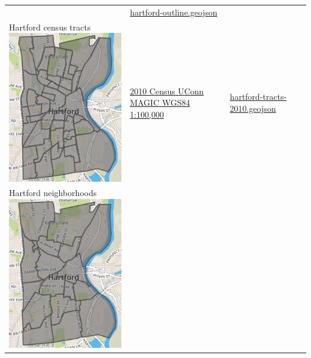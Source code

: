 \documentclass[
  english,
]{book}
\begin{document}
\begin{longtable}[]{@{}llll@{}}
\begin{minipage}[t]{0.22\columnwidth}
\end{minipage} & \begin{minipage}[t]{0.19\columnwidth}\raggedright
\href{data/hartford-outline.geojson}{hartford-outline.geojson}\strut
\end{minipage} & \begin{minipage}[t]{0.19\columnwidth}\raggedright
\strut
\end{minipage}\tabularnewline
\begin{minipage}[t]{0.28\columnwidth}\raggedright
Hartford census tracts \includegraphics{data/hartford-tracts-2010.png}\strut
\end{minipage} & \begin{minipage}[t]{0.22\columnwidth}\raggedright
\href{http://magic.lib.uconn.edu/connecticut_data.html\#boundaries}{2010 Census UConn MAGIC WGS84 1:100,000}\strut
\end{minipage} & \begin{minipage}[t]{0.19\columnwidth}\raggedright
\href{data/hartford-tracts-2010.geojson}{hartford-tracts-2010.geojson}\strut
\end{minipage} & \begin{minipage}[t]{0.19\columnwidth}\raggedright
\strut
\end{minipage}\tabularnewline
\begin{minipage}[t]{0.28\columnwidth}\raggedright
Hartford neighborhoods \includegraphics{data/hartford-neighborhoods.png}\strut

\end{minipage}
\end{longtable}
\end{document}
